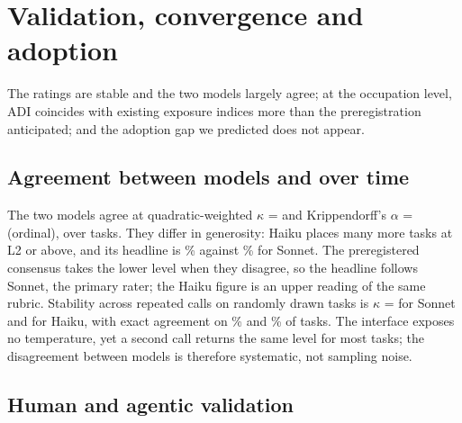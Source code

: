 \section{Validation, convergence and adoption}
\label{sec:validacion}

The ratings are stable and the two models largely agree; at the occupation level, ADI coincides with existing exposure indices more than the preregistration anticipated; and the adoption gap we predicted does not appear.

\subsection{Agreement between models and over time}

The two models agree at quadratic-weighted $\kappa$ =  and Krippendorff's $\alpha$ =  (ordinal), over  tasks.
They differ in generosity: Haiku places many more tasks at L2 or above, and its headline is \% against \% for Sonnet.
The preregistered consensus takes the lower level when they disagree, so the headline follows Sonnet, the primary rater; the Haiku figure is an upper reading of the same rubric.
Stability across repeated calls on  randomly drawn tasks is $\kappa$ =  for Sonnet and  for Haiku, with exact agreement on \% and \% of tasks.
The interface exposes no temperature, yet a second call returns the same level for most tasks; the disagreement between models is therefore systematic, not sampling noise.

\subsection{Human and agentic validation}

